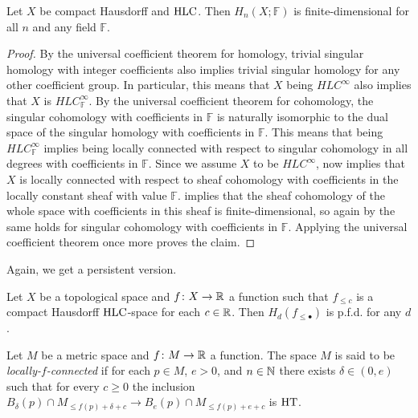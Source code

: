 \begin{prop} \label{prop:fin_dim_sing_hom}
	Let $X$ be compact Hausdorff and $\mathrm{HLC}$.
	Then $H_n(X; \mathbb{F})$ is finite-dimensional for all $n$ and any field $\mathbb{F}$.
\end{prop}
 
\begin{proof}
	By the universal coefficient theorem for homology, trivial singular homology with integer coefficients also implies trivial singular homology for any other coefficient group. In particular, this means that $X$ being $HLC^{\infty}$ also implies that $X$ is $HLC^{\infty}_{\mathbb{F}}$. By the universal coefficient theorem for cohomology, the singular cohomology with coefficients in $\mathbb{F}$ is naturally isomorphic to the dual space of the singular homology with coefficients in $\mathbb{F}$. This means that being $HLC^{\infty}_{\mathbb{F}}$ implies being locally connected with respect to singular cohomology in all degrees with coefficients in $\mathbb{F}$. Since we assume $X$ to be $HLC^{\infty}$, \cite[Theorem III.1.1]{MR1481706} now implies that $X$ is locally connected with respect to sheaf cohomology with coefficients in the locally constant sheaf with value $\mathbb{F}$. \cite[Corollary II.17.7]{MR1481706} implies that the sheaf cohomology of the whole space with coefficients in this sheaf is finite-dimensional, so again by \cite[Theorem III.1.1]{MR1481706} the same holds for singular cohomology with coefficients in $\mathbb{F}$. Applying the universal coefficient theorem once more proves the claim.
\end{proof}

Again, we get a persistent version.

\begin{cor}
	Let $X$ be a topological space and $f \colon X \to \mathbb{R}$ a function such that $f_{\leq c}$ is a compact Hausdorff $\mathrm{HLC}$-space for each $c \in \mathbb{R}$.
	Then $H_d(f_{\leq\bullet})$ is p.f.d. for any $d$.
\end{cor}

\begin{defi}
	Let $M$ be a metric space and $f \colon M \to \mathbb{R}$ a function.
	The space $M$ is said to be \textit{locally-$f$-connected} if for each $p \in M$, $e > 0$, and $n \in \mathbb{N}$ there exists $\delta \in (0, e)$ such that for every $c \geq 0$ the inclusion $B_\delta(p) \cap M_{\leq f(p)+\delta+c} \to B_e(p) \cap M_{\leq f(p)+e+c}$ is $\mathrm{HT}$.
\end{defi}